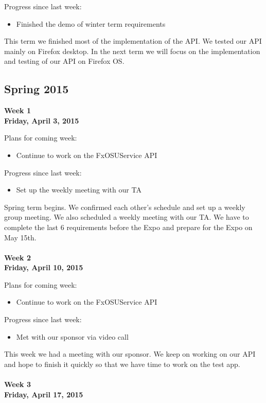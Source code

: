 \noindent Progress since last week:
\begin{itemize}
\item Finished the demo of winter term requirements
\end{itemize}

\noindent This term we finished most of the implementation of the API. We tested our API mainly on Firefox desktop. In the next term we will focus on the implementation and testing of our API on Firefox OS.

\subsection{Spring 2015}
\textbf{Week 1\\Friday, April 3, 2015\\}

\noindent Plans for coming week:
\begin{itemize}
\item Continue to work on the FxOSUService API
\end{itemize}

\noindent Progress since last week:
\begin{itemize}
\item Set up the weekly meeting with our TA
\end{itemize}

\noindent Spring term begins. We confirmed each other's schedule and set up a weekly group meeting. We also scheduled a weekly meeting with our TA. We have to complete the last 6 requirements before the Expo and prepare for the Expo on May 15th. \\
\\
\textbf{Week 2\\Friday, April 10, 2015\\}

\noindent Plans for coming week:
\begin{itemize}
\item Continue to work on the FxOSUService API
\end{itemize}

\noindent Progress since last week:
\begin{itemize}
\item Met with our sponsor via video call
\end{itemize}

\noindent This week we had a meeting with our sponsor. We keep on working on our API and hope to finish it quickly so that we have time to work on the test app. \\
\\
\textbf{Week 3\\Friday, April 17, 2015\\}

